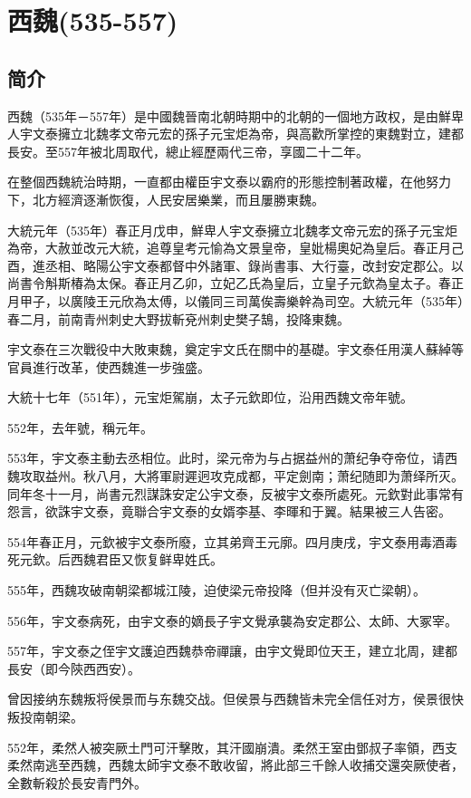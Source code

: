 

\section{西魏\tiny(535-557)}

\subsection{简介}


西魏（535年－557年）是中國魏晉南北朝時期中的北朝的一個地方政权，是由鮮卑人宇文泰擁立北魏孝文帝元宏的孫子元宝炬為帝，與高歡所掌控的東魏對立，建都長安。至557年被北周取代，總止經歷兩代三帝，享國二十二年。

在整個西魏統治時期，一直都由權臣宇文泰以霸府的形態控制著政權，在他努力下，北方經濟逐漸恢復，人民安居樂業，而且屢勝東魏。

大統元年（535年）春正月戊申，鮮卑人宇文泰擁立北魏孝文帝元宏的孫子元宝炬為帝，大赦並改元大統，追尊皇考元愉為文景皇帝，皇妣楊奧妃為皇后。春正月己酉，進丞相、略陽公宇文泰都督中外諸軍、錄尚書事、大行臺，改封安定郡公。以尚書令斛斯椿為太保。春正月乙卯，立妃乙氏為皇后，立皇子元欽為皇太子。春正月甲子，以廣陵王元欣為太傅，以儀同三司萬俟壽樂幹為司空。大統元年（535年）春二月，前南青州刺史大野拔斬兗州刺史樊子鵠，投降東魏。

宇文泰在三次戰役中大敗東魏，奠定宇文氏在關中的基礎。宇文泰任用漢人蘇綽等官員進行改革，使西魏進一步強盛。

大統十七年（551年），元宝炬駕崩，太子元欽即位，沿用西魏文帝年號。

552年，去年號，稱元年。

553年，宇文泰主動去丞相位。此时，梁元帝为与占据益州的萧纪争夺帝位，请西魏攻取益州。秋八月，大將軍尉遲迥攻克成都，平定劍南；萧纪随即为萧绎所灭。同年冬十一月，尚書元烈謀誅安定公宇文泰，反被宇文泰所處死。元欽對此事常有怨言，欲誅宇文泰，竟聯合宇文泰的女婿李基、李暉和于翼。結果被三人告密。

554年春正月，元欽被宇文泰所廢，立其弟齊王元廓。四月庚戌，宇文泰用毒酒毒死元欽。后西魏君臣又恢复鲜卑姓氏。

555年，西魏攻破南朝梁都城江陵，迫使梁元帝投降（但并没有灭亡梁朝）。

556年，宇文泰病死，由宇文泰的嫡長子宇文覺承襲為安定郡公、太師、大冢宰。

557年，宇文泰之侄宇文護迫西魏恭帝禪讓，由宇文覺即位天王，建立北周，建都長安（即今陝西西安）。

曾因接纳东魏叛将侯景而与东魏交战。但侯景与西魏皆未完全信任对方，侯景很快叛投南朝梁。

552年，柔然人被突厥土門可汗擊敗，其汗國崩潰。柔然王室由鄧叔子率領，西支柔然南逃至西魏，西魏太師宇文泰不敢收留，將此部三千餘人收捕交還突厥使者，全數斬殺於長安青門外。







